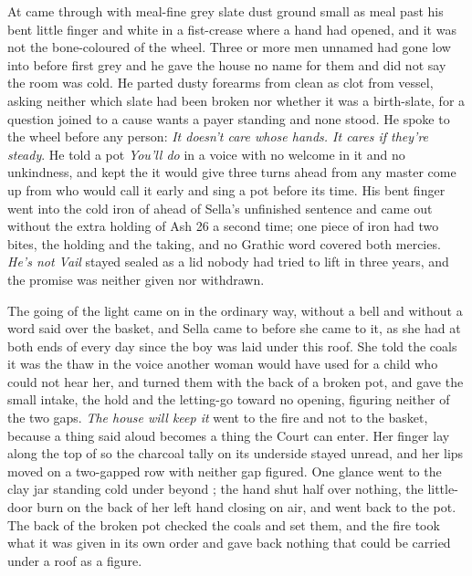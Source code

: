 At   came through  with meal-fine grey slate dust ground small as meal past his bent little finger and white in a fist-crease where a hand had opened, and it was not the bone-coloured  of the wheel. Three or more men unnamed had gone low into  before first grey and he gave the house no name for them and did not say the room was cold. He parted dusty forearms from clean as clot from vessel, asking neither which slate had been broken nor whether it was a birth-slate, for a question joined to a cause wants a payer standing and none stood. He spoke to the wheel before any person: \emph{It doesn't care whose hands. It cares if they're steady}. He told a pot \emph{You'll do} in a voice with no welcome in it and no unkindness, and kept the  it would give three turns ahead from any master come up from  who would call it early and sing a pot before its time. His bent finger went into the cold iron of  ahead of Sella's unfinished sentence and came out without the extra holding of Ash 26 a second time; one piece of iron had two bites, the holding and the taking, and no Grathic word covered both mercies. \emph{He's not Vail} stayed sealed as a lid nobody had tried to lift in three years, and the promise was neither given nor withdrawn.

\scenebreak

The going of the light came on in the ordinary way, without a bell and without a word said over the basket, and Sella came to  before she came to it, as she had at both ends of every day since the boy was laid under this roof. She told the coals it was the thaw in the voice another woman would have used for a child who could not hear her, and turned them with the back of a broken pot, and gave the small intake, the hold and the letting-go toward no opening, figuring neither of the two gaps. \emph{The house will keep it} went to the fire and not to the basket, because a thing said aloud becomes a thing the Court can enter. Her finger lay along the top of  so the charcoal tally on its underside stayed unread, and her lips moved on a two-gapped row with neither gap figured. One glance went to the clay jar standing cold under  beyond ; the hand shut half over nothing, the little-door burn on the back of her left hand closing on air, and went back to the pot. The back of the broken pot checked the coals and set them, and the fire took what it was given in its own order and gave back nothing that could be carried under a roof as a figure.

